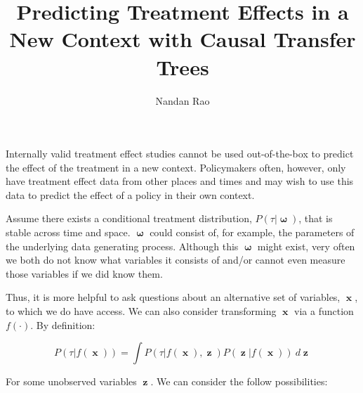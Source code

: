 \documentclass[a4paper,12pt]{article}
\title{ Predicting Treatment Effects in a New Context with Causal Transfer Trees }
\author{Nandan Rao}
\DeclareMathOperator*{\om}{\mathbf{\omega}}
\DeclareMathOperator*{\x}{\mathbf{x}}
\DeclareMathOperator*{\z}{\mathbf{z}}
\begin{document}
Internally valid treatment effect studies cannot be used out-of-the-box to predict the effect of the treatment in a new context. Policymakers often, however, only have treatment effect data from other places and times and may wish to use this data to predict the effect of a policy in their own context.

Assume there exists a conditional treatment distribution, $ P(\tau | \om) $, that is stable across time and space. $\om$ could consist of, for example, the parameters of the underlying data generating process. Although this $\om$ might exist, very often we both do not know what variables it consists of and/or cannot even measure those variables if we did know them.

Thus, it is more helpful to ask questions about an alternative set of variables, $\x$, to which we do have access. We can also consider transforming $\x$ via a function $f(\cdot)$. By definition:

$$
P(\tau | f(\x) ) = \int P(\tau | f(\x), \z ) P( \z | f(\x)) \ d\z
$$

For some unobserved variables $\z$. We can consider the follow possibilities:
\end{document}
